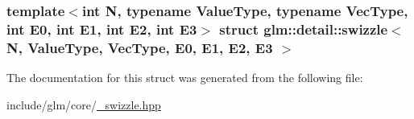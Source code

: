 \subsubsection*{template$<$int \-N, typename \-Value\-Type, typename \-Vec\-Type, int \-E0, int \-E1, int \-E2, int \-E3$>$ struct glm\-::detail\-::swizzle$<$ N, Value\-Type, Vec\-Type, E0, E1, E2, E3 $>$}



\-The documentation for this struct was generated from the following file\-:\begin{DoxyCompactItemize}
\item 
include/glm/core/\hyperlink{__swizzle_8hpp}{\-\_\-swizzle.\-hpp}\end{DoxyCompactItemize}
